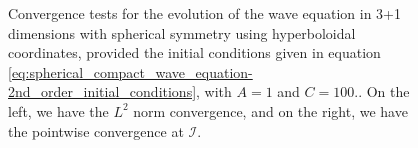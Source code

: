 \begin{figure}[h]
\begin{subfigure}[b]{0.45\textwidth}
    \end{subfigure}
    \caption{Convergence tests for the evolution of the wave equation in 3+1 dimensions with spherical symmetry using hyperboloidal coordinates, provided the initial conditions given in equation \eqref{eq:spherical_compact_wave_equation-2nd_order_initial_conditions}, with $A = 1$ and $C = 100$.. On the left, we have the $L^2$ norm convergence, and on the right, we have the pointwise convergence at $\mathscr{I}$.}
    \label{fig:spherical_compact_wave_equation-2nd_order-convergence}
\end{figure}